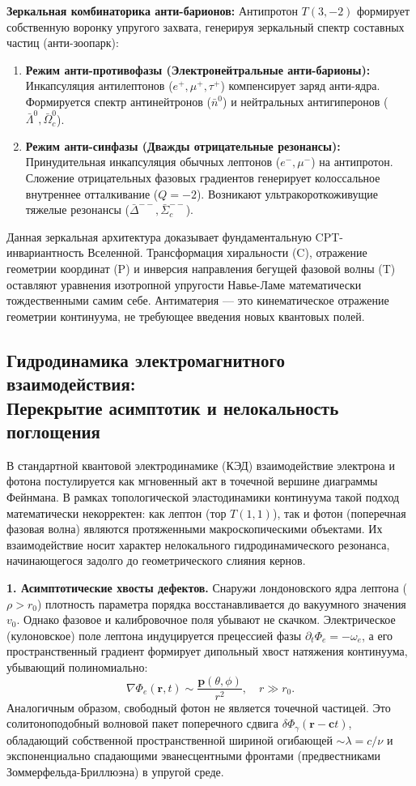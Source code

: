 \documentclass[11pt,a4paper]{article}
\begin{document}
	\textbf{Зеркальная комбинаторика анти-барионов:}
	Антипротон $T(3,-2)$ формирует собственную воронку упругого захвата, генерируя зеркальный спектр составных частиц (анти-зоопарк):
	\begin{enumerate}
		\item \textbf{Режим анти-противофазы (Электронейтральные анти-барионы):} Инкапсуляция антилептонов ($e^+, \mu^+, \tau^+$) компенсирует заряд анти-ядра. Формируется спектр антинейтронов ($\bar{n}^0$) и нейтральных антигиперонов ($\bar{\Lambda}^0, \bar{\Omega}_c^0$).
		\item \textbf{Режим анти-синфазы (Дважды отрицательные резонансы):} Принудительная инкапсуляция обычных лептонов ($e^-, \mu^-$) на антипротон. Сложение отрицательных фазовых градиентов генерирует колоссальное внутреннее отталкивание ($Q=-2$). Возникают ультракороткоживущие тяжелые резонансы ($\bar{\Delta}^{--}, \bar{\Sigma}_c^{--}$).
	\end{enumerate}
	
	Данная зеркальная архитектура доказывает фундаментальную CPT-инвариантность Вселенной. Трансформация хиральности (C), отражение геометрии координат (P) и инверсия направления бегущей фазовой волны (T) оставляют уравнения изотропной упругости Навье-Ламе математически тождественными самим себе. Антиматерия — это кинематическое отражение геометрии континуума, не требующее введения новых квантовых полей.

\subsection{Гидродинамика электромагнитного взаимодействия:\\ Перекрытие асимптотик и нелокальность поглощения}

В стандартной квантовой электродинамике (КЭД) взаимодействие электрона и фотона постулируется как мгновенный акт в точечной вершине диаграммы Фейнмана. В рамках топологической эластодинамики континуума такой подход математически некорректен: как лептон (тор $T(1,1)$), так и фотон (поперечная фазовая волна) являются протяженными макроскопическими объектами. Их взаимодействие носит характер нелокального гидродинамического резонанса, начинающегося задолго до геометрического слияния кернов.

\textbf{1. Асимптотические хвосты дефектов.}
Снаружи лондоновского ядра лептона ($\rho > r_0$) плотность параметра порядка восстанавливается до вакуумного значения $v_0$. Однако фазовое и калибровочное поля убывают не скачком. Электрическое (кулоновское) поле лептона индуцируется прецессией фазы $\partial_t \Phi_e = -\omega_e$, а его пространственный градиент формирует дипольный хвост натяжения континуума, убывающий полиномиально:
\begin{equation}
	\nabla \Phi_e(\mathbf{r}, t) \sim \frac{\mathbf{p}(\theta, \phi)}{r^2}, \quad r \gg r_0.
\end{equation}
Аналогичным образом, свободный фотон не является точечной частицей. Это солитоноподобный волновой пакет поперечного сдвига $\delta \Phi_\gamma(\mathbf{r}-\mathbf{c}t)$, обладающий собственной пространственной шириной огибающей $\sim \lambda = c/\nu$ и экспоненциально спадающими эванесцентными фронтами (предвестниками Зоммерфельда-Бриллюэна) в упругой среде.
\end{document}
